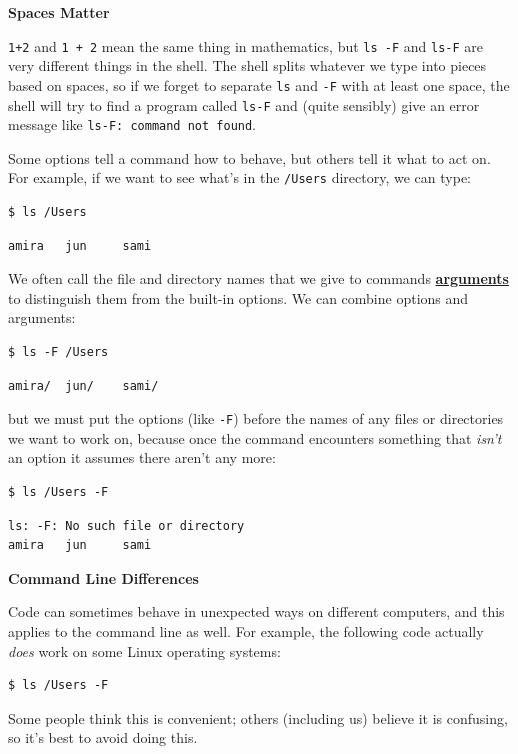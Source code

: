 \documentclass[
]{krantz}
\renewenvironment{quote}{\begin{VF}}{\end{VF}}
\newcommand{\gref}[2]{\hyperlink{#2}{\textbf{#1}}}
\begin{document}
\begin{quote}
\textbf{Spaces Matter}

\texttt{1+2} and \texttt{1~+~2} mean the same thing in mathematics,
but \texttt{ls~-F} and \texttt{ls-F} are very different things in the shell.
The shell splits whatever we type into pieces based on spaces,
so if we forget to separate \texttt{ls} and \texttt{-F} with at least one space,
the shell will try to find a program called \texttt{ls-F} and (quite sensibly)
give an error message like \texttt{ls-F:\ command\ not\ found}.
\end{quote}

Some options tell a command how to behave,
but others tell it what to act on.
For example,
if we want to see what's in the \texttt{/Users} directory,
we can type:

\begin{verbatim}
$ ls /Users
\end{verbatim}

\begin{verbatim}
amira   jun     sami
\end{verbatim}

We often call the file and directory names that we give to commands \gref{arguments}{command\_line\_argument}
to distinguish them from the built-in options.
We can combine options and arguments:

\begin{verbatim}
$ ls -F /Users
\end{verbatim}

\begin{verbatim}
amira/  jun/    sami/
\end{verbatim}

but we must put the options (like \texttt{-F})
before the names of any files or directories we want to work on,
because once the command encounters something that \emph{isn't} an option
it assumes there aren't any more:

\begin{verbatim}
$ ls /Users -F
\end{verbatim}

\begin{verbatim}
ls: -F: No such file or directory
amira   jun     sami
\end{verbatim}

\begin{quote}
\textbf{Command Line Differences}

Code can sometimes behave in unexpected ways on different computers,
and this applies to the command line as well.
For example,
the following code actually \emph{does} work on some Linux operating systems:

\begin{verbatim}
$ ls /Users -F
\end{verbatim}

Some people think this is convenient;
others (including us) believe it is confusing,
so it's best to avoid doing this.
\end{quote}
\end{document}
